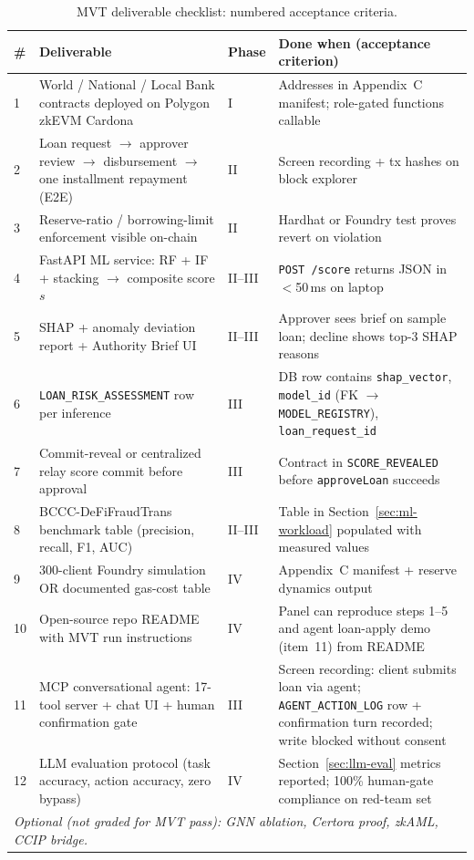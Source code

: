 \documentclass[12pt,a4paper]{report}
\newcommand{\tableheadcolor}{\rowcolor{TableHeadBg}}
\begin{document}
\begin{table}[H]
\centering
\caption[MVT deliverable checklist]{MVT deliverable checklist: numbered acceptance criteria.}
\label{tab:mvt-checklist}
\begin{tabular}{p{0.5cm}p{4.8cm}p{1.6cm}p{6.3cm}}
\toprule
\tableheadcolor
\textbf{\#} & \textbf{Deliverable} & \textbf{Phase} & \textbf{Done when (acceptance criterion)} \\
\midrule
1 & World / National / Local Bank contracts deployed on Polygon zkEVM Cardona & I & Addresses in Appendix~C manifest; role-gated functions callable \\
2 & Loan request $\to$ approver review $\to$ disbursement $\to$ one installment repayment (E2E) & II & Screen recording + tx hashes on block explorer \\
3 & Reserve-ratio / borrowing-limit enforcement visible on-chain & II & Hardhat or Foundry test proves revert on violation \\
4 & FastAPI ML service: RF + IF + stacking $\to$ composite score $s$ & II--III & \texttt{POST /score} returns JSON in $<$50\,ms on laptop \\
5 & SHAP + anomaly deviation report + Authority Brief UI & II--III & Approver sees brief on sample loan; decline shows top-3 SHAP reasons \\
6 & \texttt{LOAN\_RISK\_ASSESSMENT} row per inference & III & DB row contains \texttt{shap\_vector}, \texttt{model\_id} (FK $\to$ \texttt{MODEL\_REGISTRY}), \texttt{loan\_request\_id} \\
7 & Commit-reveal or centralized relay score commit before approval & III & Contract in \texttt{SCORE\_REVEALED} before \texttt{approveLoan} succeeds \\
8 & BCCC-DeFiFraudTrans benchmark table (precision, recall, F1, AUC) & II--III & Table in Section~\ref{sec:ml-workload} populated with measured values \\
9 & 300-client Foundry simulation OR documented gas-cost table & IV & Appendix~C manifest + reserve dynamics output \\
10 & Open-source repo README with MVT run instructions & IV & Panel can reproduce steps 1--5 and agent loan-apply demo (item~11) from README \\
11 & MCP conversational agent: 17-tool server + chat UI + human confirmation gate & III & Screen recording: client submits loan via agent; \texttt{AGENT\_ACTION\_LOG} row + confirmation turn recorded; write blocked without consent \\
12 & LLM evaluation protocol (task accuracy, action accuracy, zero bypass) & IV & Section~\ref{sec:llm-eval} metrics reported; 100\% human-gate compliance on red-team set \\
\multicolumn{4}{l}{\textit{Optional (not graded for MVT pass): GNN ablation, Certora proof, zkAML, CCIP bridge.}} \\
\bottomrule
\end{tabular}
\end{table}
\end{document}
